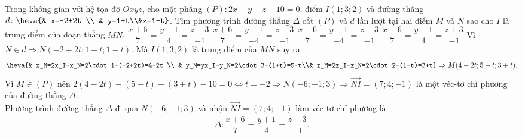 \begin{ex}%
	Trong không gian với hệ tọa độ $Oxyz$, cho mặt phẳng $(P)\colon 2x-y+z-10=0$, điểm $I(1;3;2)$ và đường thẳng $d\colon \heva{& x=-2+2t \\ & y=1+t\\&z=1-t}$. Tìm phương trình đường thẳng $\Delta$ cắt $(P)$ và $d$ lần lượt tại hai điểm $M$ và $N$ sao cho $I$ là trung điểm của đoạn thẳng $MN$.
	\choice
	{\True $\dfrac{x+6}{7}=\dfrac{y+1}{4}=\dfrac{z-3}{-1}$}
	{$\dfrac{x+6}{7}=\dfrac{y+1}{-4}=\dfrac{z-3}{-1}$}
	{$\dfrac{x-6}{7}=\dfrac{y-1}{-4}=\dfrac{z-3}{-1}$}
	{$\dfrac{x-6}{7}=\dfrac{y-1}{4}=\dfrac{z+3}{-1}$}
	\loigiai
	{
		Vì $N\in d\Rightarrow N(-2+2t;1+t;1-t)$. Mà $I(1;3;2)$ là trung điểm của $MN$ suy ra
		\begin{align*}
			\heva{& x_M=2x_I-x_N=2\cdot 1-(-2+2t)=4-2t \\ & y_M=yx_I-y_N=2\cdot 3-(1+t)=5-t\\& z_M=2z_I-z_N=2\cdot 2-(1-t)=3+t}\Rightarrow M(4-2t;5-t;3+t).
		\end{align*}
		Vì $M\in (P)$ nên $2(4-2t)-(5-t)+(3+t)-10=0\Leftrightarrow t=-2\Rightarrow N(-6;-1;3)\Rightarrow \overrightarrow{NI}=(7;4;-1)$ là một véc-tơ chỉ phương của đường thẳng $\Delta$.\\
		Phương trình đường thẳng $\Delta$ đi qua $N(-6;-1;3)$ và nhận $\overrightarrow{NI}=(7;4;-1)$ làm véc-tơ chỉ phương là
		\begin{align*}
			\Delta \colon \dfrac{x+6}{7}=\dfrac{y+1}{4}=\dfrac{z-3}{-1}.
		\end{align*}
	}
\end{ex}

